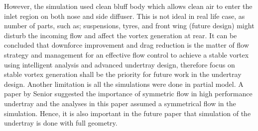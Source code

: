 \noindent However, the simulation used clean bluff body which allows clean air to enter the inlet region on both nose and side diffuser. This is not ideal in real life case, as number of parts, such as; suspensions, tyres, and front wing (future design) might disturb the incoming flow and affect the vortex generation at rear. It can be concluded that downforce improvement and drag reduction is the matter of flow strategy and management for an effective flow control to achieve a stable vortex using intelligent analysis and advanced undertray design, therefore focus on stable vortex generation shall be the priority for future work in the undertray design. Another limitation is all the simulations were done in partial model. A paper by Senior \cite{Senior2001TheEffect} suggested the importance of symmetric flow in high performance undertray and the analyses in this paper assumed a symmetrical flow in the simulation. Hence, it is also important in the future paper that simulation of the undertray is done with full geometry.


















